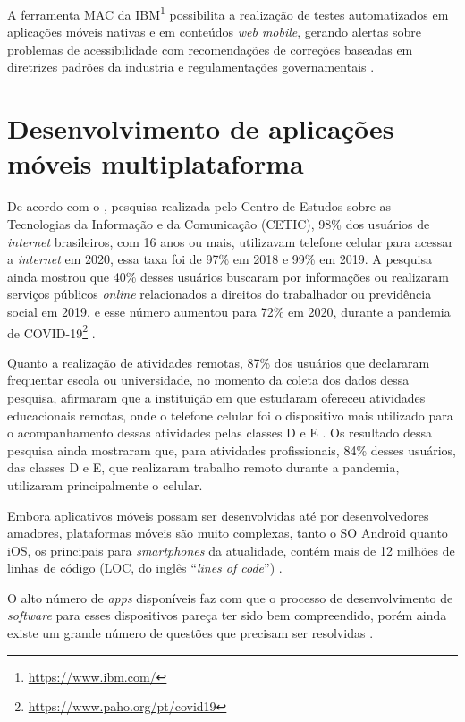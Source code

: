 A ferramenta MAC da IBM\footnote{\url{https://www.ibm.com/}} possibilita a realização de testes automatizados em aplicações
móveis nativas e em conteúdos \emph{web mobile}, gerando alertas sobre problemas de acessibilidade com recomendações de
correções baseadas em diretrizes padrões da industria e regulamentações governamentais \cite{patil2016enhanced,Yan2019}.

\section{Desenvolvimento de aplicações móveis multiplataforma}

De acordo com o , pesquisa realizada pelo Centro de Estudos sobre
as Tecnologias da Informação e da Comunicação (CETIC), 98\% dos usuários de \emph{internet} brasileiros, com 16 anos ou mais,
utilizavam telefone celular para acessar a \emph{internet} em 2020, essa taxa foi de 97\% em 2018 e 99\% em 2019.
A pesquisa ainda mostrou que 40\% desses usuários buscaram por informações ou realizaram serviços públicos \emph{online} relacionados
a direitos do trabalhador ou previdência social em 2019, e esse número aumentou para 72\% em
2020, durante a pandemia de COVID-19\footnote{\url{https://www.paho.org/pt/covid19}} \cite{CETIC_2021}.

Quanto a realização de atividades remotas, 87\% dos usuários que declararam frequentar escola ou universidade, no momento da coleta
dos dados dessa pesquisa, afirmaram que a instituição em que estudaram ofereceu atividades educacionais remotas, onde o telefone
celular foi o dispositivo mais utilizado para o acompanhamento dessas atividades pelas classes D e E \cite{CETIC_2021}. Os resultado dessa pesquisa
ainda mostraram que, para atividades profissionais, 84\% desses usuários, das classes D e E, que realizaram trabalho remoto durante a pandemia,
utilizaram principalmente o celular.

Embora aplicativos móveis possam ser desenvolvidas até por desenvolvedores amadores, plataformas móveis são muito complexas, tanto o
SO Android quanto iOS, os principais para \emph{smartphones} da atualidade, contém mais de 12 milhões de linhas de código
(LOC, do inglês ``\emph{lines of code}'') \cite{pressman2014software}.

O alto número de \emph{apps} disponíveis faz com que o processo de desenvolvimento de \emph{software} para esses dispositivos pareça
ter sido bem compreendido, porém ainda existe um grande número de questões que precisam ser resolvidas \cite{pressman2014software,Wasserman2010}.


